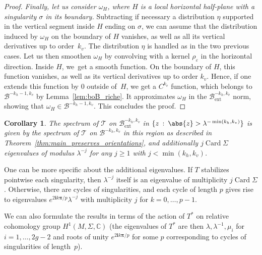 \documentclass[JEP,XML,SOM,Unicode]{cedram}
\newcommand{\ext}{\mathrm{ext}}
\newcommand{\boB}{\mathcal{B}}
\newcommand{\boT}{\mathcal{T}}
\newcommand{\CC}{\mathbb{C}}
\newcommand{\ic}{\mathbf{i}}
\newcommand{\bpi}{\boldsymbol{\pi}}
\newcommand{\st}{\::\:}
\DeclareMathOperator{\Card}{Card}
\let\epsilon\varepsilon
\newtheorem{cor}[thm]{Corollary}
\theoremstyle{definition}
\numberwithin{equation}{section}
\begin{document}
\begin{proof}
\emph{Finally, let us consider $\omega_H$, where $H$ is a local horizontal
half-plane with a singularity $\sigma$ in its boundary.} Subtracting if
necessary a distribution $\eta$ supported in the vertical segment inside $H$
ending on $\sigma$, we can assume that the distribution induced by $\omega_H$
on the boundary of $H$ vanishes, as well as all its vertical derivatives up
to order~$k_v$. The distribution $\eta$ is handled as in the two previous
cases. Let us then smoothen $\omega_H$ by convolving with a kernel
$\rho_\epsilon$ in the horizontal direction. Inside $H$, we~get a smooth
function. On the boundary of $H$, this function vanishes, as well as its
vertical derivatives up to order $k_v$. Hence, if one extends this function
by $0$ outside of~$H$, we get a $C^{k_v}$ function, which belongs to
$\boB^{-k_h-1, k_v}$ by Lemma~\ref{lem:boB_riche}. It approximates $\omega_H$
in the $\boB_{\ext}^{-k_h, k_v}$ norm, showing that $\omega_H \in
\boB^{-k_h-1, k_v}$. This concludes the proof.
\end{proof}

\begin{cor}
\label{cor:spectrum_ext} The spectrum of $\boT$ on $\boB_{\ext}^{-k_h, k_v}$
in $\{z \st \abs{z}>\lambda^{-\min(k_h, k_v)}\}$ is given by the spectrum of
$\boT$ on $\boB^{-k_h, k_v}$ in this region as described in
Theorem~\ref{thm:main_preserves_orientations}, and additionally $j \Card
\Sigma$ eigenvalues of modulus $\lambda^{-j}$ for any $j\geq 1$ with
$j<\min(k_h, k_v)$.
\end{cor}
One can be more specific about the additional eigenvalues. If $T$ stabilizes
pointwise each singularity, then $\lambda^{-j}$ itself is an eigenvalue of
multiplicity $j\Card \Sigma$. Otherwise, there are cycles of singularities,
and each cycle of length $p$ gives rise to eigenvalues $e^{2\ic k\bpi/p}
\lambda^{-j}$ with multiplicity $j$ for $k=0,\dotsc, p-1$.

We can also formulate the results in terms of the action of $T^\ast$ on
relative cohomology group $H^1(M,\Sigma,\CC)$ (the eigenvalues of $T^\ast$ are
then $\lambda,\lambda^{-1},\mu_i$ for $i=1,\dots,2g-2$ and roots of unity
$e^{2\ic k\bpi/p}$ for some $p$ corresponding to cycles of singularities of
length~$p$).
\end{document}

